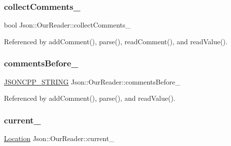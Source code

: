 \subsubsection{\texorpdfstring{collect\+Comments\+\_\+}{collectComments\_}}
{\footnotesize\ttfamily bool Json\+::\+Our\+Reader\+::collect\+Comments\+\_\+\hspace{0.3cm}{\ttfamily [private]}}



Referenced by add\+Comment(), parse(), read\+Comment(), and read\+Value().

\mbox{\label{classJson_1_1OurReader_a9c53e77e290eb9081298210a955fda6a_a9c53e77e290eb9081298210a955fda6a}} 
\subsubsection{\texorpdfstring{comments\+Before\+\_\+}{commentsBefore\_}}
{\footnotesize\ttfamily \hyperlink{json_8h_a1e723f95759de062585bc4a8fd3fa4be_a1e723f95759de062585bc4a8fd3fa4be}{J\+S\+O\+N\+C\+P\+P\+\_\+\+S\+T\+R\+I\+NG} Json\+::\+Our\+Reader\+::comments\+Before\+\_\+\hspace{0.3cm}{\ttfamily [private]}}



Referenced by add\+Comment(), parse(), and read\+Value().

\mbox{\label{classJson_1_1OurReader_a5211fbbba94be80a22dd2317c621efcc_a5211fbbba94be80a22dd2317c621efcc}} 
\subsubsection{\texorpdfstring{current\+\_\+}{current\_}}
{\footnotesize\ttfamily \hyperlink{classJson_1_1OurReader_a1bdc7bbc52ba87cae6b19746f2ee0189_a1bdc7bbc52ba87cae6b19746f2ee0189}{Location} Json\+::\+Our\+Reader\+::current\+\_\+\hspace{0.3cm}{\ttfamily [private]}}



